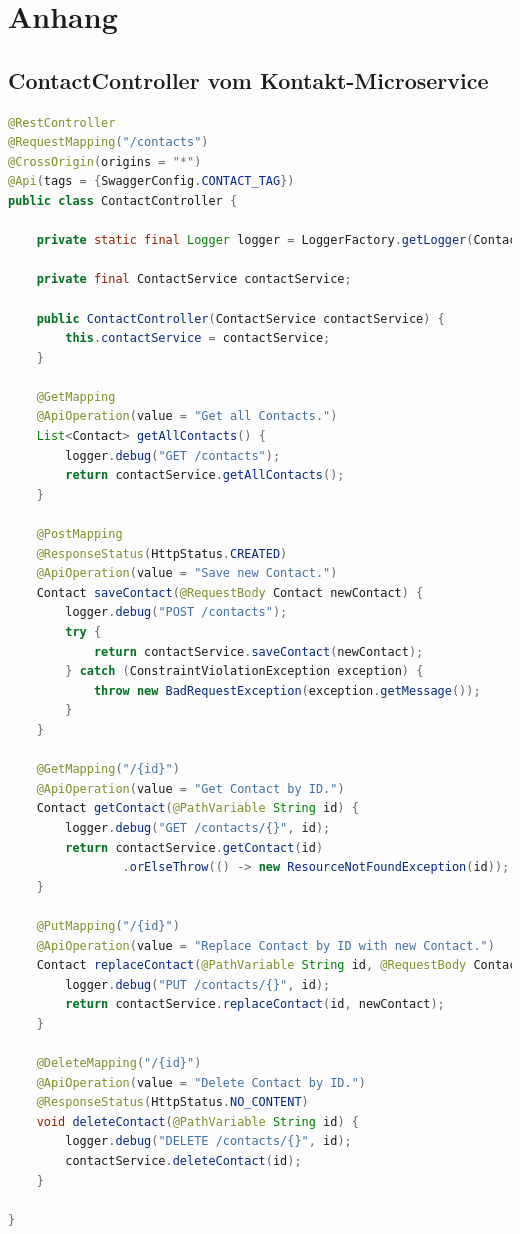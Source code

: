 \section*{Anhang}
\label{anhang}

\appendix

\subsection*{ContactController vom Kontakt-Microservice}

\begin{lstlisting}[language=java]
@RestController
@RequestMapping("/contacts")
@CrossOrigin(origins = "*")
@Api(tags = {SwaggerConfig.CONTACT_TAG})
public class ContactController {

    private static final Logger logger = LoggerFactory.getLogger(ContactApplication.class);

    private final ContactService contactService;

    public ContactController(ContactService contactService) {
        this.contactService = contactService;
    }

    @GetMapping
    @ApiOperation(value = "Get all Contacts.")
    List<Contact> getAllContacts() {
        logger.debug("GET /contacts");
        return contactService.getAllContacts();
    }

    @PostMapping
    @ResponseStatus(HttpStatus.CREATED)
    @ApiOperation(value = "Save new Contact.")
    Contact saveContact(@RequestBody Contact newContact) {
        logger.debug("POST /contacts");
        try {
            return contactService.saveContact(newContact);
        } catch (ConstraintViolationException exception) {
            throw new BadRequestException(exception.getMessage());
        }
    }

    @GetMapping("/{id}")
    @ApiOperation(value = "Get Contact by ID.")
    Contact getContact(@PathVariable String id) {
        logger.debug("GET /contacts/{}", id);
        return contactService.getContact(id)
                .orElseThrow(() -> new ResourceNotFoundException(id));
    }

    @PutMapping("/{id}")
    @ApiOperation(value = "Replace Contact by ID with new Contact.")
    Contact replaceContact(@PathVariable String id, @RequestBody Contact newContact) {
        logger.debug("PUT /contacts/{}", id);
        return contactService.replaceContact(id, newContact);
    }

    @DeleteMapping("/{id}")
    @ApiOperation(value = "Delete Contact by ID.")
    @ResponseStatus(HttpStatus.NO_CONTENT)
    void deleteContact(@PathVariable String id) {
        logger.debug("DELETE /contacts/{}", id);
        contactService.deleteContact(id);
    }

}
\end{lstlisting}

